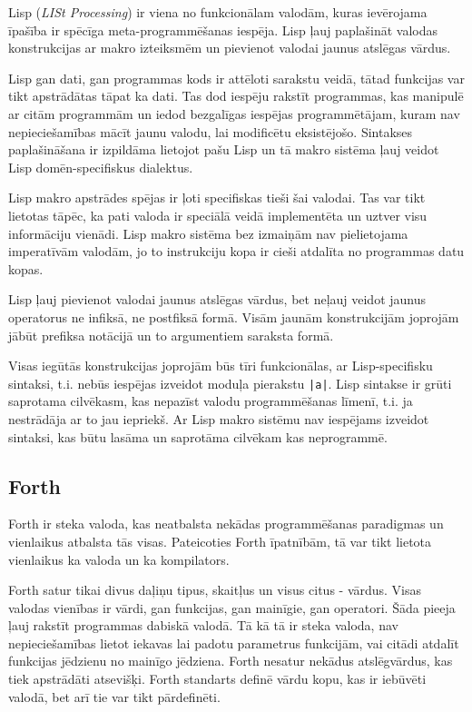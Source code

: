 Lisp (\emph{LISt Processing}) ir viena no funkcionālam valodām, kuras ievērojama īpašība ir spēcīga meta-programmēšanas iespēja. Lisp ļauj paplašināt valodas konstrukcijas ar makro izteiksmēm un pievienot valodai jaunus atslēgas vārdus.

Lisp gan dati, gan programmas kods ir attēloti sarakstu veidā, tātad funkcijas var tikt apstrādātas tāpat ka dati. Tas dod iespēju rakstīt programmas, kas manipulē ar citām programmām un iedod bezgalīgas iespējas programmētājam, kuram nav nepieciešamības mācīt jaunu valodu, lai modificētu eksistējošo. Sintakses paplašināšana ir izpildāma lietojot pašu Lisp un tā makro sistēma ļauj veidot Lisp domēn-specifiskus dialektus.

Lisp makro apstrādes spējas ir ļoti specifiskas tieši šai valodai. Tas var tikt lietotas tāpēc, ka pati valoda ir speciālā veidā implementēta un uztver visu informāciju vienādi. Lisp makro sistēma bez izmaiņām nav pielietojama imperatīvām valodām, jo to instrukciju kopa ir cieši atdalīta no programmas datu kopas.

Lisp ļauj pievienot valodai jaunus atslēgas vārdus, bet neļauj veidot jaunus operatorus ne infiksā, ne postfiksā formā. Visām jaunām konstrukcijām joprojām jābūt prefiksa notācijā un to argumentiem saraksta formā.

Visas iegūtās konstrukcijas joprojām būs tīri funkcionālas, ar Lisp-specifisku sintaksi, t.i. nebūs iespējas izveidot moduļa pierakstu \verb/|a|/. Lisp sintakse ir grūti saprotama cilvēkasm, kas nepazīst valodu programmēšanas līmenī, t.i. ja nestrādāja ar to jau iepriekš. Ar Lisp makro sistēmu nav iespējams izveidot sintaksi, kas būtu lasāma un saprotāma cilvēkam kas neprogrammē.

\cite{Seibel:PracticalCommonLisp}

\subsection{\label{sbs:rel_forth}Forth}

Forth ir steka valoda, kas neatbalsta nekādas programmēšanas paradigmas un vienlaikus atbalsta tās visas. Pateicoties Forth īpatnībām, tā var tikt lietota vienlaikus ka valoda un ka kompilators.

Forth satur tikai divus daļiņu tipus, skaitļus un visus citus - vārdus. Visas valodas vienības ir vārdi, gan funkcijas, gan mainīgie, gan operatori. Šāda pieeja ļauj rakstīt programmas dabiskā valodā. Tā kā tā ir steka valoda, nav nepieciešamības lietot iekavas lai padotu parametrus funkcijām, vai citādi atdalīt funkcijas jēdzienu no mainīgo jēdziena. Forth nesatur nekādus atslēgvārdus, kas tiek apstrādāti atsevišķi. Forth standarts definē vārdu kopu, kas ir iebūvēti valodā, bet arī tie var tikt pārdefinēti.

